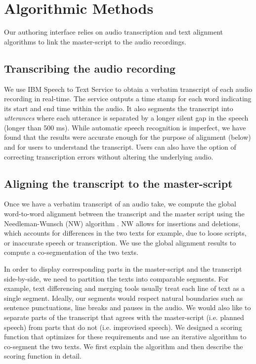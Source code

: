 \section{Algorithmic Methods}
\label{sec:algorithms}
Our authoring interface relies on audio transcription and text alignment algorithms to link the master-script to the audio recordings.  

\subsection{Transcribing the audio recording}
We use IBM Speech to Text Service \cite{ibmspeechtotext} to obtain a verbatim transcript of each audio recording in real-time. The service outputs a time stamp for each word indicating its start and end time within the audio. It also segments the transcript into \textit{utterances} where each utterance is separated by a longer silent gap in the speech (longer than 500 ms). While automatic speech recognition is imperfect, we have found that the results were accurate enough for the purpose of alignment (below) and for users to understand the transcript. Users can also have the option of correcting transcription errors without altering the underlying audio.
  
\subsection{Aligning the transcript to the master-script}
Once we have a verbatim transcript of an audio take, we compute the global word-to-word alignment between the transcript and the master script using the Needleman-Wunsch (NW) algorithm \cite{needleman1970general}. NW allows for insertions and deletions, which accounts for differences in the two texts for example, due to loose scripts, or inaccurate speech or transcription. We use the global alignment results to compute a co-segmentation of the two texts.

In order to display corresponding parts in the master-script and the transcript side-by-side, we need to partition the texts into comparable segments. For example, text differencing and merging tools usually treat each line of text as a single segment.
Ideally, our segments would respect natural boundaries such as sentence punctuations, line breaks and pauses in the audio. We would also like to separate parts of the transcript that agrees with the master-script (i.e. planned speech) from parts that do not (i.e. improvised speech).  
We designed a scoring function that optimizes for these requirements and use an iterative algorithm to co-segment the two texts. We first explain the algorithm and then describe the scoring function in detail.

